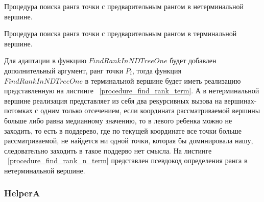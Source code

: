 \begin{algorithm}
\begin{algorithmic}[1]
    \EndIf

    \EndIf
    
\EndProcedure
\end{algorithmic}
\caption{Процедура поиска ранга точки с предварительным рангом в нетерминальной вершине.}
\label{procedure_find_rank_n_term}
\end{algorithm}

\begin{algorithm}
\begin{algorithmic}[1]
    \EndIf
        \EndIf
    \EndFor
\EndProcedure
\end{algorithmic}
\caption{Процедура поиска ранга точки с предварительным рангом в терминальной вершине.}
\label{procedure_find_rank_term}
\end{algorithm}

Для адаптации в функцию $FindRankInNDTreeOne$ будет добавлен дополнительный аргумент, ранг точки $P_i$, тогда функция $FindRankInNDTreeOne$ в терминальной вершине будет иметь реализацию представленную на листинге ~\ref{procedure_find_rank_term}. А в нетерминальной вершине реализация представляет из себя два рекурсивных вызова на вершинах-потомках с одним только отсечением, если координата рассматриваемой вершины больше либо равна медианному значению, то в левого ребенка можно не заходить, то есть в поддерево, где по текущей координате все точки больше рассматриваемой, не найдется ни одной точки, которая бы доминировала нашу, следовательно заходить в такое поддерво нет смысла. На листинге ~\ref{procedure_find_rank_n_term} представлен псевдокод определения ранга в нетерминальной вершине.

\subsubsection{HelperA}

